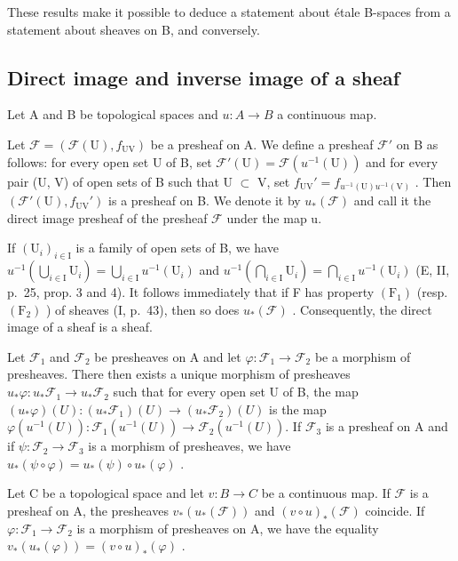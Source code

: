 These results make it possible to deduce a statement about étale B-spaces from a statement about sheaves on B, and conversely.

\subsection{Direct image and inverse image of a sheaf}

Let A and B be topological spaces and \(u: A \rightarrow B\) a continuous map.

Let \(\mathcal{F} = (\mathcal{F}(\mathrm{U}), f_{\mathrm{UV}})\) be a presheaf on A. We define a presheaf \(\mathcal{F}'\) on B as follows: for every open set U of B, set \(\mathcal{F}'(\mathrm{U}) = \mathcal{F}(u^{-1}(\mathrm{U}))\) and for every pair (U, V) of open sets of B such that U \(\subset\) V, set \(f_{\mathrm{UV}}' = f_{u^{-1}(\mathrm{U})u^{-1}(\mathrm{V})}\) . Then \((\mathcal{F}'(\mathrm{U}), f_{\mathrm{UV}}')\) is a presheaf on B. We denote it by \(u_{*}(\mathcal{F})\) and call it the direct image presheaf of the presheaf \(\mathcal{F}\) under the map u.

If \((\mathrm{U}_{i})_{i\in\mathrm{I}}\) is a family of open sets of B, we have \(u^{-1}(\bigcup_{i\in\mathrm{I}}\mathrm{U}_{i})=\bigcup_{i\in\mathrm{I}}u^{-1}(\mathrm{U}_{i})\) and \(u^{-1}(\bigcap_{i\in\mathrm{I}}\mathrm{U}_{i})=\bigcap_{i\in\mathrm{I}}u^{-1}(\mathrm{U}_{i})\) (E, II, p.~25, prop. 3 and 4). It follows immediately that if F has property \((\mathrm{F}_{1})\) (resp. \((\mathrm{F}_{2})\) ) of sheaves (I, p.~43), then so does \(u_{*}(\mathcal{F})\) . Consequently, the direct image of a sheaf is a sheaf.

Let \(\mathcal{F}_1\) and \(\mathcal{F}_2\) be presheaves on A and let \(\varphi\colon\mathcal{F}_1\to\mathcal{F}_2\) be a morphism of presheaves. There then exists a unique morphism of presheaves \(u_*\varphi\colon u_*\mathcal{F}_1\to u_*\mathcal{F}_2\) such that for every open set U of B, the map \((u_*\varphi)(U)\colon(u_*\mathcal{F}_1)(U)\to(u_*\mathcal{F}_2)(U)\) is the map \(\varphi(u^{-1}(U))\colon\mathcal{F}_{1}(u^{-1}(U))\to\mathcal{F}_{2}(u^{-1}(U)).\) If \(\mathcal{F}_{3}\) is a presheaf on A and if \(\psi\colon\mathcal{F}_{2}\to\mathcal{F}_{3}\) is a morphism of presheaves, we have \(u_{*}(\psi\circ\varphi)=u_{*}(\psi)\circ u_{*}(\varphi)\) .

Let C be a topological space and let \(v: B \to C\) be a continuous map. If \(\mathcal{F}\) is a presheaf on A, the presheaves \(v_{*}(u_{*}(\mathcal{F}))\) and \((v \circ u)_{*}(\mathcal{F})\) coincide. If \(\varphi: \mathcal{F}_{1} \to \mathcal{F}_{2}\) is a morphism of presheaves on A, we have the equality \(v_{*}(u_{*}(\varphi)) = (v \circ u)_{*}(\varphi)\) .

